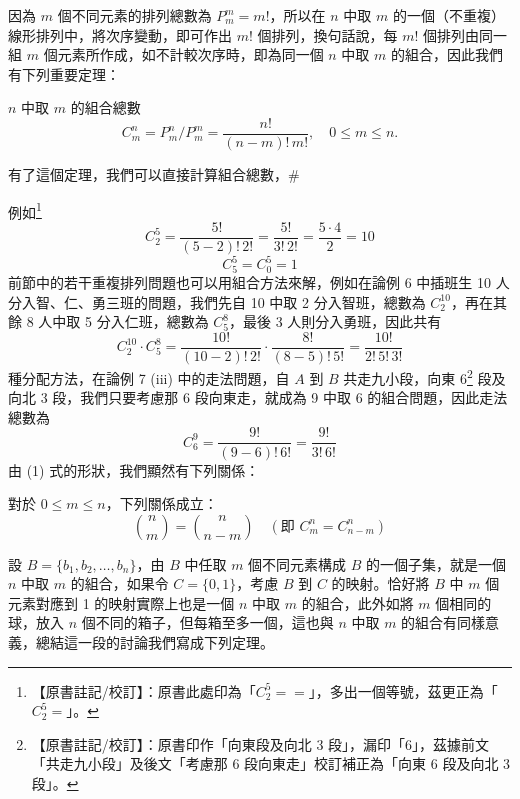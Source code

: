 因為 $m$ 個不同元素的排列總數為 $P_m^m = m!$，所以在 $n$ 中取 $m$ 的一個（不重複）線形排列中，將次序變動，即可作出 $m!$ 個排列，換句話說，每 $m!$ 個排列由同一組 $m$ 個元素所作成，如不計較次序時，即為同一個 $n$ 中取 $m$ 的組合，因此我們有下列重要定理：

\medskip
\begin{theorem}\label{thm:b5s-2-7}
$n$ 中取 $m$ 的組合總數
\begin{equation}
C_m^n = P_m^n / P_m^m = \frac{n!}{(n - m)!\, m!}, \quad 0 \le m \le n. \tag{1}
\end{equation}
\end{theorem}
有了這個定理，我們可以直接計算組合總數，\hfill $\#$

\medskip
\noindent 例如\label{note:b5s-ch2-p75-eq}\footnote{【原書註記/校訂】：原書此處印為「$C_2^5 ==$」，多出一個等號，茲更正為「$C_2^5 =$」。}
\[
C_2^5 = \frac{5!}{(5 - 2)!\, 2!} = \frac{5!}{3!\, 2!} = \frac{5 \cdot 4}{2} = 10
\]
\[
C_5^5 = C_0^5 = 1
\]
前節中的若干重複排列問題也可以用組合方法來解，例如在論例 6 中插班生 10 人分入智、仁、勇三班的問題，我們先自 10 中取 2 分入智班，總數為 $C_2^{10}$，再在其餘 8 人中取 5 分入仁班，總數為 $C_5^8$，最後 3 人則分入勇班，因此共有
\[
C_2^{10} \cdot C_5^8 = \frac{10!}{(10 - 2)!\, 2!} \cdot \frac{8!}{(8 - 5)!\, 5!} = \frac{10!}{2!\, 5!\, 3!}
\]
種分配方法，在論例 7 (iii) 中的走法問題，自 $A$ 到 $B$ 共走九小段，向東 6\label{note:b5s-ch2-p76-east6}\footnote{【原書註記/校訂】：原書印作「向東段及向北 3 段」，漏印「6」，茲據前文「共走九小段」及後文「考慮那 6 段向東走」校訂補正為「向東 6 段及向北 3 段」。} 段及向北 3 段，我們只要考慮那 6 段向東走，就成為 9 中取 6 的組合問題，因此走法總數為
\[
C_6^9 = \frac{9!}{(9 - 6)!\, 6!} = \frac{9!}{3!\, 6!}
\]
由 (1) 式的形狀，我們顯然有下列關係：

\medskip
\begin{corollary*}
對於 $0 \le m \le n$，下列關係成立：
\begin{equation}
\binom{n}{m} = \binom{n}{n - m} \quad (\text{即 } C_m^n = C_{n-m}^n) \tag{2}
\end{equation}
\end{corollary*}

設 $B = \{b_1, b_2, \ldots, b_n\}$，由 $B$ 中任取 $m$ 個不同元素構成 $B$ 的一個子集，就是一個 $n$ 中取 $m$ 的組合，如果令 $C = \{0, 1\}$，考慮 $B$ 到 $C$ 的映射。恰好將 $B$ 中 $m$ 個元素對應到 1 的映射實際上也是一個 $n$ 中取 $m$ 的組合，此外如將 $m$ 個相同的球，放入 $n$ 個不同的箱子，但每箱至多一個，這也與 $n$ 中取 $m$ 的組合有同樣意義，總結這一段的討論我們寫成下列定理。

